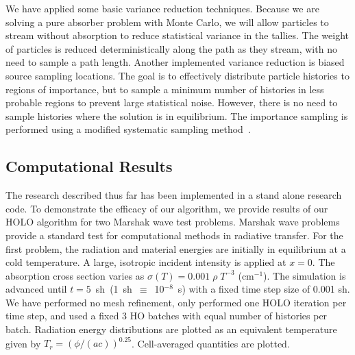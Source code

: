 \documentclass[11pt]{article}
\begin{document}
We have applied some basic variance reduction techniques.
 Because we are solving a pure absorber problem with Monte Carlo, we will allow
particles to stream without absorption to reduce statistical 
variance in the tallies.  The weight of particles is reduced deterministically along
the path as they stream, with no need to sample a path length.  Another implemented 
variance reduction is biased source sampling locations.  The goal is to effectively distribute particle
histories to regions of importance, but to sample a minimum number of histories in
less probable regions to prevent large statistical noise.  However, there is no need
to sample histories where the solution is in equilibrium.
The importance sampling is
performed using a modified
systematic sampling method~\cite{shultis_mc}. 

\subsection{Computational Results}

The research described thus far has been implemented in a stand alone research code.
To demonstrate the efficacy of our algorithm, we provide results of our HOLO
algorithm for two Marshak wave test problems.  Marshak wave problems provide a standard test
for computational methods in radiative transfer.  
For the first problem, the radiation and material energies are initially in
equilibrium at a cold temperature.   A large, isotropic incident intensity is applied
at $x=0$.  The absorption cross section varies as $\sigma(T) = 0.001\;\rho\; T^{-3}$ (cm$^{-1}$).
The simulation is advanced until $t=5$~sh~(1~sh~$\equiv$~10$^{-8}$~s) with a fixed time step size of 0.001 sh. 
We have performed no mesh refinement, only performed one HOLO iteration per time
step, and used a fixed 3 HO batches with equal number of histories per batch. 
Radiation energy distributions are plotted as an equivalent temperature given by
$T_r=(\phi/(ac))^{0.25}$.  Cell-averaged quantities are plotted.
\end{document}
